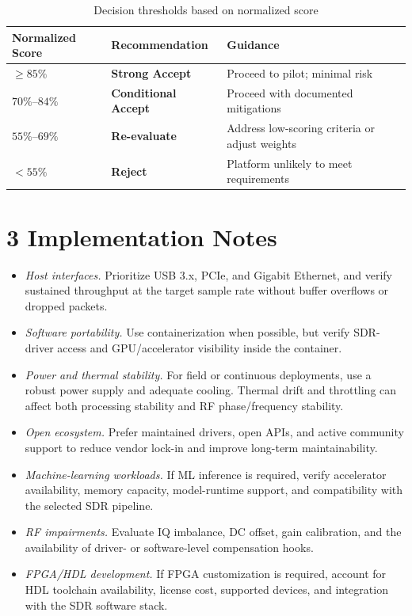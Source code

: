 \documentclass[11pt,a4paper]{article}
\begin{document}
\begin{table}[H]
  \centering
  \small
  \begin{tabular}{@{}lll@{}}
    \toprule
    Normalized Score & Recommendation & Guidance \\
    \midrule
    $\geq 85\%$ & \textbf{Strong Accept} & Proceed to pilot; minimal risk \\
    $70\%$--$84\%$ & \textbf{Conditional Accept} & Proceed with documented mitigations \\
    $55\%$--$69\%$ & \textbf{Re-evaluate} & Address low-scoring criteria or adjust weights \\
    $< 55\%$ & \textbf{Reject} & Platform unlikely to meet requirements \\
    \bottomrule
  \end{tabular}
  \caption{Decision thresholds based on normalized score}
  \label{tab:decision-thresholds}
\end{table}

\section*{3 Implementation Notes}

\begin{itemize}
  \item \textit{Host interfaces.} Prioritize USB 3.x, PCIe, and Gigabit Ethernet, and verify sustained throughput at the target sample rate without buffer overflows or dropped packets.
  \item \textit{Software portability.} Use containerization when possible, but verify SDR-driver access and GPU/accelerator visibility inside the container.
  \item \textit{Power and thermal stability.} For field or continuous deployments, use a robust power supply and adequate cooling. Thermal drift and throttling can affect both processing stability and RF phase/frequency stability.
  \item \textit{Open ecosystem.} Prefer maintained drivers, open APIs, and active community support to reduce vendor lock-in and improve long-term maintainability.
  \item \textit{Machine-learning workloads.} If ML inference is required, verify accelerator availability, memory capacity, model-runtime support, and compatibility with the selected SDR pipeline.
  \item \textit{RF impairments.} Evaluate IQ imbalance, DC offset, gain calibration, and the availability of driver- or software-level compensation hooks.
  \item \textit{FPGA/HDL development.} If FPGA customization is required, account for HDL toolchain availability, license cost, supported devices, and integration with the SDR software stack.
\end{itemize}
\end{document}
